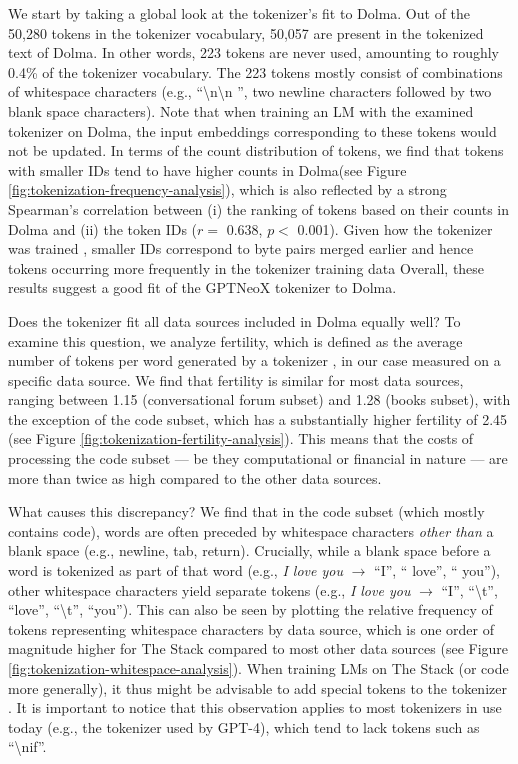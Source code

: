 \documentclass{article}
\newcommand{\dolma}{Dolma\xspace}
\begin{document}
We start by taking a global look at the tokenizer's fit to \dolma. Out of the 50,280 tokens in the tokenizer vocabulary, 50,057 are present in the tokenized text of \dolma. In other words, 223 tokens are never used, amounting to roughly 0.4\% of the tokenizer vocabulary. The 223 tokens mostly consist of combinations of whitespace characters (e.g., ``\textbackslash n\textbackslash n {} '', two newline characters followed by two blank space characters). Note that when training an LM with the examined tokenizer on \dolma, the input embeddings corresponding to these tokens would not be updated. 
In terms of the count distribution of tokens, we find that tokens with smaller IDs tend to have higher counts in \dolma (see Figure \ref{fig:tokenization-frequency-analysis}), which is also reflected by a strong Spearman's correlation between (i) the ranking of tokens based on their counts in \dolma and (ii) the token IDs ($r =$ 0.638, $p <$ 0.001). Given how the tokenizer was trained \citep{sennrich-etal-2016-neural, Black2022GPTNeoX20BAO}, smaller IDs correspond to byte pairs merged earlier and hence tokens occurring more frequently in the tokenizer training data 
Overall, these results suggest a good fit of the GPTNeoX tokenizer to \dolma. 

Does the tokenizer fit all data sources included in \dolma equally well? To examine this question, we analyze fertility, which is defined as the average number of tokens per word generated by a tokenizer \citep{acs2019,Scao2022BLOOMA1}, in our case measured on a specific data source.
We find that fertility is similar for most data sources, ranging between 1.15 (conversational forum subset) and 1.28 (books subset), with the exception of the code subset, which has a substantially higher fertility of 2.45 (see Figure \ref{fig:tokenization-fertility-analysis}). This means that the costs of processing the code subset --- be they computational or financial in nature \citep{petrov2023language} --- are more than twice as high compared to the other data sources. 

What causes this discrepancy? We find that in the code subset (which mostly contains code), words are often preceded by whitespace characters \emph{other than} 
a blank space (e.g., newline, tab, return). Crucially, while a blank space before a word is tokenized as part of that word (e.g., \textit{I love you} $\rightarrow$ ``I'', `` love'', `` you''), other whitespace characters yield separate tokens (e.g., \textit{I \quad love \quad you} $\rightarrow$ ``I'', ``\textbackslash t'', ``love'', ``\textbackslash t'', ``you''). This can also be seen by plotting the relative frequency of tokens representing whitespace characters by data source, which is one order of magnitude higher for The Stack compared to most other data sources (see Figure \ref{fig:tokenization-whitespace-analysis}). When training LMs on The Stack (or code more generally), it thus might be advisable to add special tokens to the tokenizer \citep[e.g., ``\textbackslash nif'';][]{hong-etal-2021-avocado}. It is important to notice that this observation applies to most tokenizers in use today (e.g., the tokenizer used by GPT-4), which tend to lack tokens such as ``\textbackslash nif''.
\end{document}
